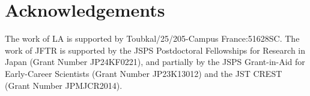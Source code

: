 \documentclass[a4paper,11pt]{article}
\begin{document}




\section*{Acknowledgements}
The work of LA is supported by Toubkal/25/205-Campus France:51628SC. 
The work of JFTR is supported by the JSPS Postdoctoral Fellowships for Research in Japan (Grant Number JP24KF0221), and partially by the JSPS Grant-in-Aid for Early-Career Scientists (Grant Number JP23K13012) and the JST CREST (Grant Number JPMJCR2014). 
\end{document}
